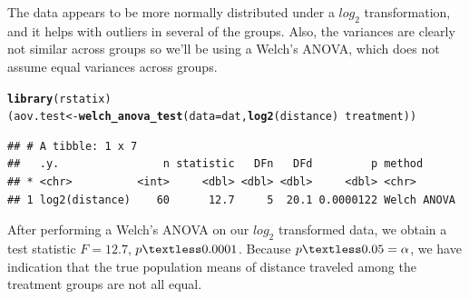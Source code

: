 \documentclass{article}\usepackage[]{graphicx}\usepackage[]{xcolor}
\makeatletter
\newcommand{\hlopt}[1]{\textcolor[rgb]{0,0,0}{#1}}%
\newcommand{\hldef}[1]{\textcolor[rgb]{0.345,0.345,0.345}{#1}}%
\newcommand{\hlkwb}[1]{\textcolor[rgb]{0.69,0.353,0.396}{#1}}%
\newcommand{\hlkwc}[1]{\textcolor[rgb]{0.333,0.667,0.333}{#1}}%
\newcommand{\hlkwd}[1]{\textcolor[rgb]{0.737,0.353,0.396}{\textbf{#1}}}%
\newenvironment{kframe}{%
 \def\at@end@of@kframe{}%
 \ifinner\ifhmode%
  \def\at@end@of@kframe{\end{minipage}}%
  \begin{minipage}{\columnwidth}%
 \fi\fi%
 \def\FrameCommand##1{\hskip\@totalleftmargin \hskip-\fboxsep
 \colorbox{shadecolor}{##1}\hskip-\fboxsep
     \hskip-\linewidth \hskip-\@totalleftmargin \hskip\columnwidth}%
 \MakeFramed {\advance\hsize-\width
   \@totalleftmargin\z@ \linewidth\hsize
   \@setminipage}}%
 {\par\unskip\endMakeFramed%
 \at@end@of@kframe}
\newenvironment{knitrout}{}{} %
\makeatother
\begin{document}
The data appears to be more normally distributed under a $log_{2}$ transformation, and it helps with outliers in several of the groups. Also, the variances are clearly not similar across groups so we'll be using a Welch's ANOVA, which does not assume equal variances across groups. 

\begin{knitrout}\scriptsize
{}\color{fgcolor}\begin{kframe}
\begin{alltt}
\hlkwd{library}\hldef{(rstatix)}
\hldef{(aov.test} \hlkwb{<-} \hlkwd{welch_anova_test}\hldef{(}\hlkwc{data} \hldef{= dat,} \hlkwd{log2}\hldef{(distance)} \hlopt{~} \hldef{treatment))}
\end{alltt}
\begin{verbatim}
## # A tibble: 1 x 7
##   .y.                n statistic   DFn   DFd         p method     
## * <chr>          <int>     <dbl> <dbl> <dbl>     <dbl> <chr>      
## 1 log2(distance)    60      12.7     5  20.1 0.0000122 Welch ANOVA
\end{verbatim}
\end{kframe}
\end{knitrout}

After performing a Welch's ANOVA on our $log_{2}$ transformed data, we obtain a test statistic $F = 12.7$, $p \textless 0.0001$. Because $p \textless 0.05 = \alpha$, we have indication that the true population means of distance traveled among the treatment groups are not all equal. 
\end{document}
